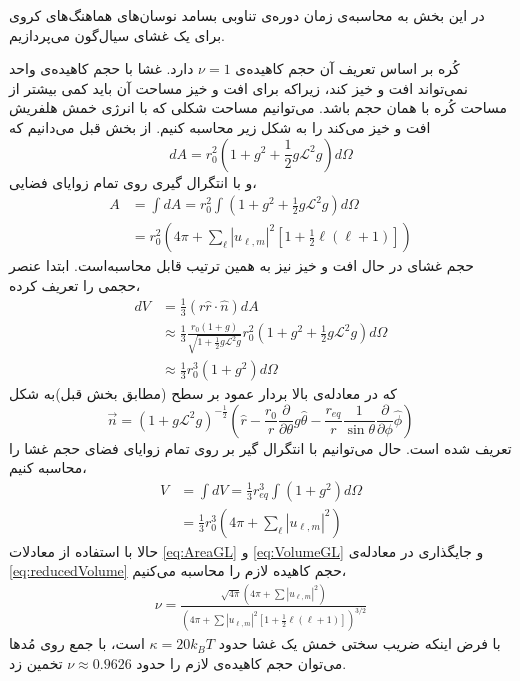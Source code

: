 
در این بخش به محاسبه‌ی زمان دوره‌ی تناوبی بسامد نوسان‌‌های هماهنگ‌های کروی برای یک غشای سیال‌گون می‌پردازیم.

 کُره‌ بر اساس تعریف آن حجم کاهیده‌ی 
 $\nu=1$
 دارد. غشا با حجم کاهیده‌ی واحد نمی‌تواند افت و خیز کند، زیراکه برای افت و خیز مساحت آن باید کمی بیشتر از مساحت کُره با همان حجم باشد. می‌توانیم مساحت شکلی که با انرژی خمش هلفریش افت و خیز می‌کند را به شکل زیر محاسبه کنیم. از بخش قبل می‌دانیم که
\begin{equation}
dA=r_{0}^2(1+g^2+\frac{1}{2}g\mathcal{L}^2g)d\Omega
\label{eq:areaPatchDifferential}
\end{equation}
 و با انتگرال گیری روی تمام زوایای فضایی،
 \begin{equation}
\begin{aligned}
A&=\int dA=r_{0}^2\int(1+g^2+\frac{1}{2}g\mathcal{L}^2g)d\Omega\\
&=r_{0}^2(4\pi+\sum_{\ell}|u_{\ell,m}|^2[1+\frac{1}{2}\ell(\ell+1)])
\label{eq:AreaGL}
\end{aligned}
\end{equation}
 حجم غشای در حال افت و خیز نیز به همین ترتیب قابل محاسبه‌است. ابتدا عنصر حجمی را تعریف کرده،
 \begin{equation}
\begin{aligned}
dV&=\frac{1}{3}(r\hat r\cdot\hat n)dA\\
&\approx\frac{1}{3}\frac{r_{0}(1+g)}{\sqrt{1+\frac{1}{2}g\mathcal{L}^2g}}r_{0}^2(1+g^2+\frac{1}{2}g\mathcal{L}^2g)d\Omega\\
&\approx\frac{1}{3}r_{0}^3(1+g^2)d\Omega
\label{eq:volumeDifferential}
\end{aligned}
\end{equation}
 که در معادله‌ی بالا بردار عمود بر سطح (مطابق بخش قبل)به شکل
 \begin{equation}
\vec n =\left(1+g\mathcal{L}^2g\right)^{-\frac{1}{2}}(\hat r-\frac{r_0}{r}\frac{\partial}{\partial\theta}g\hat\theta-\frac{r_{eq}}{r}\frac{1}{\sin\theta}\frac{\partial}{\partial\phi}\hat\phi)
\label{eq:surfaceNormal}
\end{equation}
تعریف شده است. حال می‌توانیم با انتگرال گیر بر روی تمام زوایای فضای حجم غشا را محاسبه کنیم،
\begin{equation}
\begin{aligned}
V&=\int dV=\frac{1}{3}r_{eq}^3\int(1+g^2)d\Omega\\
&=\frac{1}{3}r_{0}^3(4\pi+\sum_{\ell}|u_{\ell,m}|^2)
\label{eq:VolumeGL}
\end{aligned}
\end{equation}
حالا با استفاده از معادلات
\ref{eq:AreaGL}
و
\ref{eq:VolumeGL}
و جایگذاری در معادله‌ی
\ref{eq:reducedVolume}
حجم کاهیده لازم را محاسبه می‌کنیم،
\begin{equation}
\begin{aligned}
\nu=\frac{\sqrt{4\pi}(4\pi+\sum|u_{\ell,m}|^2)}{(4\pi+\sum|u_{\ell,m}|^2[1+\frac{1}{2}\ell(\ell+1)])^{3/2}}
\label{eq:nuUndulated}
\end{aligned}
\end{equation}
با فرض اینکه ضریب سختی خمش یک غشا حدود
$\kappa=20k_BT$
است، با جمع روی مُدها می‌توان حجم کاهیده‌ی لازم را حدود
$\nu\approx0.9626$
تخمین زد.
